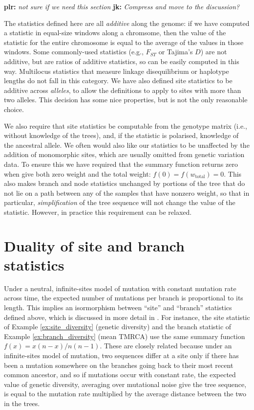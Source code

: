 \documentclass{article}
\newcommand{\tiw}{w_\text{total}} %
\newcommand{\plr}[1]{{\color{blue}\textbf{plr:} \it #1}}
\newcommand{\jk}[1]{{\color{red}\textbf{jk:} \it #1}}
\begin{document}
\plr{not sure if we need this section}
\jk{Compress and move to the discussion?}

The statistics defined here are all \emph{additive} along the genome:
if we have computed a statistic in equal-size windows along a chromsome,
then the value of the statistic for the entire chromosome is equal to
the average of the values in those windows.
Some commonly-used statistics (e.g., $F_{ST}$ or Tajima's $D$)
are not additive, but are ratios of additive statistics, so can be easily computed in this way.
Multilocus statistics that measure linkage disequilibrium or haplotype lengths
do not fall in this category.
We have also defined site statistics to be additive across \emph{alleles},
to allow the definitions to apply to sites with more than two alleles.
This decision has some nice properties, but is not the only reasonable choice.

We also require that site statistics be computable from the genotype matrix
(i.e., without knowledge of the trees),
and, if the statistic is polarised, knowledge of the ancestral allele.
We often would also like our statistics to be unaffected by the addition of monomorphic sites,
which are usually omitted from genetic variation data.
To ensure this we have required that the summary function returns zero when give both zero weight
and the total weight: $f(0) = f(\tiw) = 0$.
This also makes branch and node statistics unchanged by portions of the tree that do not lie on a path
between any of the samples that have nonzero weight,
so that in particular,
\emph{simplification} of the tree sequence will not change the value of the statistic.
However, in practice this requirement can be relaxed.


\section*{Duality of site and branch statistics}

Under a neutral, infinite-sites model of mutation with constant mutation rate across time,
the expected number of mutations per branch is proportional to its length.
This implies an isormorphism between ``site'' and ``branch'' statistics defined above,
which is discussed in more detail in \citet{ralph2019empirical}.
For instance, the site statistic of Example \ref{ex:site_diversity} (genetic diversity)
and the branch statistic of Example \ref{ex:branch_diversity} (mean TMRCA)
use the same summary function $f(x) = x(n-x)/n(n-1)$.
These are closely related because under an infinite-sites model of mutation,
two sequences differ at a site only if there has been a mutation somewhere on the branches going back
to their most recent common ancestor,
and so if mutations occur with constant rate,
the expected value of genetic diversity,
averaging over mutational noise give the tree sequence,
is equal to the mutation rate multiplied by the average distance between the two in the trees.
\end{document}
